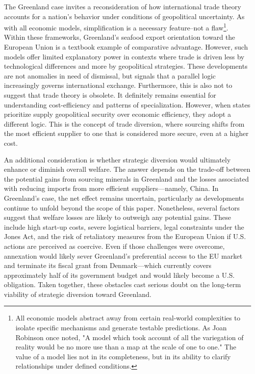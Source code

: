 \documentclass{adonis}
\begin{document}
    The Greenland case invites a reconsideration of how international trade theory accounts for a nation's behavior under conditions of geopolitical uncertainty. As with all economic models, simplification is a necessary feature–not a flaw\footnote{All economic models abstract away from certain real-world complexities to isolate specific mechanisms and generate testable predictions. As Joan Robinson once noted, "A model which took account of all the variegation of reality would be no more use than a map at the scale of one to one." The value of a model lies not in its completeness, but in its ability to clarify relationships under defined conditions.}. Within these frameworks, Greenland’s seafood export orientation toward the European Union is a textbook example of comparative advantage. However, such models offer limited explanatory power in contexts where trade is driven less by technological differences and more by geopolitical strategies. These developments are not anomalies in need of dismissal, but signals that a parallel logic increasingly governs international exchange. Furthermore, this is also not to suggest that trade theory is obsolete. It definitely remains essential for understanding cost-efficiency and patterns of specialization. However, when states prioritize supply geopolitical security over economic efficiency, they adopt a different logic. This is the concept of trade diversion, where sourcing shifts from the most efficient supplier to one that is considered more secure, even at a higher cost. 
    
    An additional consideration is whether strategic diversion would ultimately enhance or diminish overall welfare. The answer depends on the trade-off between the potential gains from sourcing minerals in Greenland and the losses associated with reducing imports from more efficient suppliers—namely, China. In Greenland’s case, the net effect remains uncertain, particularly as developments continue to unfold beyond the scope of this paper. Nonetheless, several factors suggest that welfare losses are likely to outweigh any potential gains. These include high start-up costs, severe logistical barriers, legal constraints under the Jones Act, and the risk of retaliatory measures from the European Union if U.S. actions are perceived as coercive. Even if those challenges were overcome, annexation would likely sever Greenland’s preferential access to the EU market and terminate its fiscal grant from Denmark—which currently covers approximately half of its government budget and would likely become a U.S. obligation. Taken together, these obstacles cast serious doubt on the long-term viability of strategic diversion toward Greenland.
    
\end{document}

